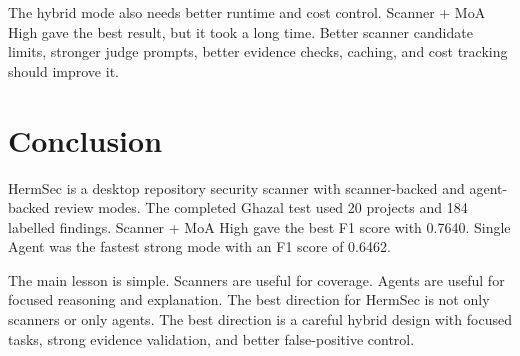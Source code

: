 \documentclass[sigconf,nonacm]{acmart}
\begin{document}
The hybrid mode also needs better runtime and cost control. Scanner + MoA High gave the best result, but it took a long time. Better scanner candidate limits, stronger judge prompts, better evidence checks, caching, and cost tracking should improve it.

\section{Conclusion}
HermSec is a desktop repository security scanner with scanner-backed and agent-backed review modes. The completed Ghazal test used 20 projects and 184 labelled findings. Scanner + MoA High gave the best F1 score with 0.7640. Single Agent was the fastest strong mode with an F1 score of 0.6462.

The main lesson is simple. Scanners are useful for coverage. Agents are useful for focused reasoning and explanation. The best direction for HermSec is not only scanners or only agents. The best direction is a careful hybrid design with focused tasks, strong evidence validation, and better false-positive control.



\end{document}
